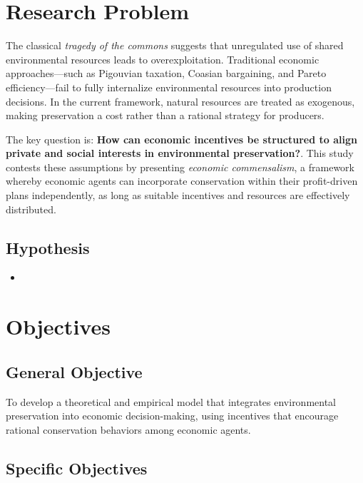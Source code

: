 \documentclass[a4paper,12pt]{article}
\begin{document}
\newpage

\section{Research Problem}
The classical \textit{tragedy of the commons} suggests that unregulated use of shared environmental resources leads to overexploitation. Traditional economic approaches—such as Pigouvian taxation, Coasian bargaining, and Pareto efficiency—fail to fully internalize environmental resources into production decisions. In the current framework, natural resources are treated as exogenous, making preservation a cost rather than a rational strategy for producers. 

The key question is: \textbf{How can economic incentives be structured to align private and social interests in environmental preservation?}. 
This study contests these assumptions by presenting \textit{economic commensalism}, a framework whereby economic agents can incorporate conservation within their profit-driven plans independently, as long as suitable incentives and resources are effectively distributed. 

\subsection{Hypothesis}

\begin{itemize}
    \item 
\end{itemize}

\newpage

\section{Objectives}

\subsection{General Objective}
To develop a theoretical and empirical model that integrates environmental preservation into economic decision-making, using incentives that encourage rational conservation behaviors among economic agents.

\subsection{Specific Objectives}
\end{document}
